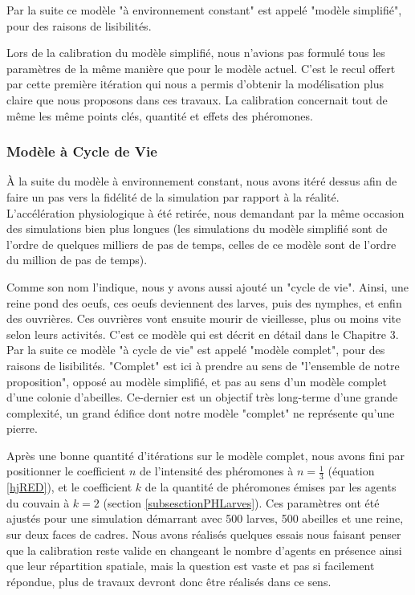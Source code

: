 			Par la suite ce modèle "à environnement constant" est appelé "modèle simplifié", pour des raisons de lisibilités.
			
			Lors de la calibration du modèle simplifié, nous n'avions pas formulé tous les paramètres de la même manière que pour le modèle actuel. C'est le recul offert par cette première itération qui nous a permis d'obtenir la modélisation plus claire que nous proposons dans ces travaux. La calibration concernait tout de même les même points clés, quantité et effets des phéromones.
			
			
			\subsubsection{Modèle à Cycle de Vie}
			À la suite du modèle à environnement constant, nous avons itéré dessus afin de faire un pas vers la fidélité de la simulation par rapport à la réalité. L'accélération physiologique à été retirée, nous demandant par la même occasion des simulations bien plus longues (les simulations du modèle simplifié sont de l'ordre de quelques milliers de pas de temps, celles de ce modèle sont de l'ordre du million de pas de temps).
			
			Comme son nom l'indique, nous y avons aussi ajouté un "cycle de vie". Ainsi, une reine pond des oeufs, ces oeufs deviennent des larves, puis des nymphes, et enfin des ouvrières. Ces ouvrières vont ensuite mourir de vieillesse, plus ou moins vite selon leurs activités. C'est ce modèle qui est décrit en détail dans le Chapitre 3.
			Par la suite ce modèle "à cycle de vie" est appelé "modèle complet", pour des raisons de lisibilités. "Complet" est ici à prendre au sens de "l'ensemble de notre proposition", opposé au modèle simplifié, et pas au sens d'un modèle complet d'une colonie d'abeilles. Ce-dernier est un objectif très long-terme d'une grande complexité, un grand édifice dont notre modèle "complet" ne représente qu'une pierre.
			
			Après une bonne quantité d'itérations sur le modèle complet, nous avons fini par positionner le coefficient $n$ de l'intensité des phéromones à $n = \frac{1}{3}$ (équation \ref{hjRED}), et le coefficient $k$ de la quantité de phéromones émises par les agents du couvain à $k=2$ (section \ref{subsesctionPHLarves}). Ces paramètres ont été ajustés pour une simulation démarrant avec 500 larves, 500 abeilles et une reine, sur deux faces de cadres. Nous avons réalisés quelques essais nous faisant penser que la calibration reste valide en changeant le nombre d'agents en présence ainsi que leur répartition spatiale, mais la question est vaste et pas si facilement répondue, plus de travaux devront donc être réalisés dans ce sens.
		
